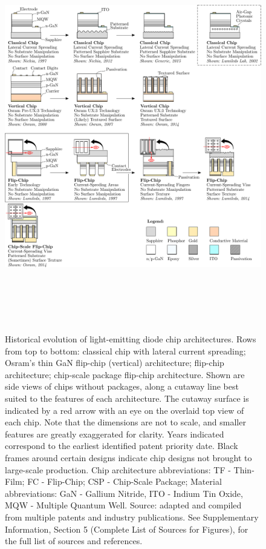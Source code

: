 \documentclass[twoside,twocolumn,9pt]{article}
\begin{document}
\begin{figure}
 \centering
 \includegraphics[height=17cm]{2_SSL_EES/article/figures/chip_architecture_overview.pdf}
 \caption{Historical evolution of light-emitting diode chip architectures. Rows from top to bottom: classical chip with lateral current spreading; Osram’s thin GaN flip-chip (vertical) architecture; flip-chip architecture; chip-scale package flip-chip architecture. Shown are side views of chips without packages, along a cutaway line best suited to the features of each architecture. The cutaway surface is indicated by a red arrow with an eye on the overlaid top view of each chip. Note that the dimensions are not to scale, and smaller features are greatly exaggerated for clarity. Years indicated correspond to the earliest identified patent priority date. Black frames around certain designs indicate chip designs not brought to large-scale production. Chip architecture abbreviations: TF - Thin-Film; FC - Flip-Chip; CSP - Chip-Scale Package; Material abbreviations: GaN - Gallium Nitride, ITO - Indium Tin Oxide, MQW - Multiple Quantum Well. Source: adapted and compiled from multiple patents and industry publications. See Supplementary Information, Section 5 (Complete List of Sources for Figures), for the full list of sources and references.}
 \label{fgr:chip_architecture_overview}
\end{figure}
\end{document}
